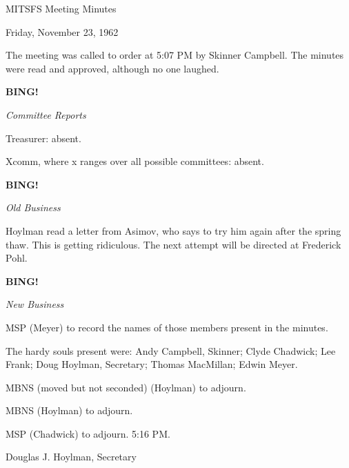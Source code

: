 \documentclass[12pt]{article}
\newcommand{\bing}{{\bf BING!} }
\newcommand{\goto}[1]{\bing \vskip 12pt \centerline{{\em{#1}}}}
\begin{document}
\begin{center}

MITSFS Meeting Minutes

Friday, November 23, 1962

\end{center}
 
\vspace{12pt}

\setlength{\parskip}{6pt}

\noindent
The meeting was called to order at 5:07 PM by Skinner Campbell. The minutes were read and approved, although no one laughed.

\goto{Committee Reports}

Treasurer: absent.

Xcomm, where x ranges over all possible committees: absent.

\goto{Old Business}

Hoylman read a letter from Asimov, who says to try him again after the spring thaw. This is getting ridiculous. The next attempt will be directed at Frederick Pohl.

\goto{New Business}

MSP (Meyer) to record the names of those members present in the minutes.

The hardy souls present were: Andy Campbell, Skinner; Clyde Chadwick; Lee Frank; Doug Hoylman, Secretary; Thomas MacMillan; Edwin Meyer.

MBNS (moved but not seconded) (Hoylman) to adjourn.

MBNS (Hoylman) to adjourn.

MSP (Chadwick) to adjourn. 5:16 PM.

\vspace{12pt}

\centerline{Douglas J. Hoylman, Secretary}
\end{document}
